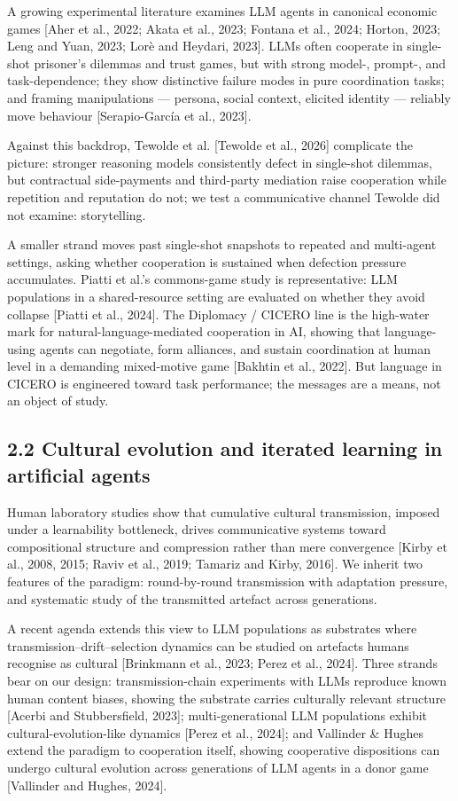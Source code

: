 \documentclass[
  10pt,
  letterpaper,
]{article}
\begin{document}
A growing experimental literature examines LLM agents in canonical
economic games {[}Aher et al., 2022; Akata et al., 2023; Fontana et al.,
2024; Horton, 2023; Leng and Yuan, 2023; Lorè and Heydari, 2023{]}. LLMs
often cooperate in single-shot prisoner's dilemmas and trust games, but
with strong model-, prompt-, and task-dependence; they show distinctive
failure modes in pure coordination tasks; and framing manipulations ---
persona, social context, elicited identity --- reliably move behaviour
{[}Serapio-García et al., 2023{]}.

Against this backdrop, Tewolde et al. {[}Tewolde et al., 2026{]}
complicate the picture: stronger reasoning models consistently defect in
single-shot dilemmas, but contractual side-payments and third-party
mediation raise cooperation while repetition and reputation do not; we
test a communicative channel Tewolde did not examine: storytelling.

A smaller strand moves past single-shot snapshots to repeated and
multi-agent settings, asking whether cooperation is sustained when
defection pressure accumulates. Piatti et al.'s commons-game study is
representative: LLM populations in a shared-resource setting are
evaluated on whether they avoid collapse {[}Piatti et al., 2024{]}. The
Diplomacy / CICERO line is the high-water mark for
natural-language-mediated cooperation in AI, showing that language-using
agents can negotiate, form alliances, and sustain coordination at human
level in a demanding mixed-motive game {[}Bakhtin et al., 2022{]}. But
language in CICERO is engineered toward task performance; the messages
are a means, not an object of study.

\subsection{2.2 Cultural evolution and iterated learning in artificial
agents}\label{cultural-evolution-and-iterated-learning-in-artificial-agents}

Human laboratory studies show that cumulative cultural transmission,
imposed under a learnability bottleneck, drives communicative systems
toward compositional structure and compression rather than mere
convergence {[}Kirby et al., 2008, 2015; Raviv et al., 2019; Tamariz and
Kirby, 2016{]}. We inherit two features of the paradigm: round-by-round
transmission with adaptation pressure, and systematic study of the
transmitted artefact across generations.

A recent agenda extends this view to LLM populations as substrates where
transmission--drift--selection dynamics can be studied on artefacts
humans recognise as cultural {[}Brinkmann et al., 2023; Perez et al.,
2024{]}. Three strands bear on our design: transmission-chain
experiments with LLMs reproduce known human content biases, showing the
substrate carries culturally relevant structure {[}Acerbi and
Stubbersfield, 2023{]}; multi-generational LLM populations exhibit
cultural-evolution-like dynamics {[}Perez et al., 2024{]}; and Vallinder
\& Hughes extend the paradigm to cooperation itself, showing cooperative
dispositions can undergo cultural evolution across generations of LLM
agents in a donor game {[}Vallinder and Hughes, 2024{]}.
\end{document}
